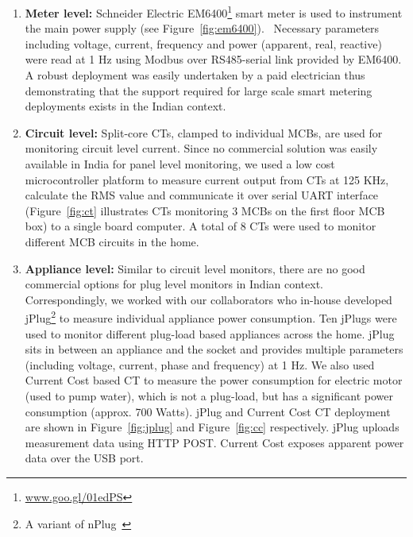 \documentclass[10pt]{sensys-proc}
\newcommand{\figref}[1]{Figure~\ref{#1}}
\newcommand{\denselistbib}{
  \itemsep -.6pt\topsep-4pt\partopsep-20pt
}
\begin{document}
\begin{enumerate}\denselistbib
\item \textbf{Meter level:} Schneider Electric EM6400\footnote{\url{www.goo.gl/01edPS}} smart meter is used to instrument the main power supply (see \figref{fig:em6400}).%
~Necessary parameters including voltage, current, frequency and power (apparent, real, reactive) were read at 1 Hz using Modbus over RS485-serial link provided by EM6400. A robust deployment was easily undertaken by a paid electrician thus demonstrating that the support required for large scale smart metering deployments exists in the Indian context. 

\item \textbf{Circuit level:} Split-core CTs, clamped to individual MCBs, are used for monitoring circuit level current. Since no commercial solution was easily available in India for panel level monitoring, we used a low cost microcontroller platform to measure current output from CTs at 125 KHz, calculate the RMS value and communicate it over serial UART interface (\figref{fig:ct} illustrates CTs monitoring 3 MCBs on the first floor MCB box) to a single board computer. A total of 8 CTs were used to monitor different MCB circuits in the home.

\item \textbf{Appliance level:} Similar to circuit level monitors, there are no good commercial options for plug level monitors in Indian context. Correspondingly, we worked with our collaborators who in-house developed jPlug\footnote{A variant of nPlug~\cite{nplug}} to measure individual appliance power consumption. Ten jPlugs were used to monitor different plug-load based appliances across the home. jPlug sits in between an appliance and the socket and provides multiple parameters (including voltage, current, phase and frequency) at 1 Hz. We also used Current Cost based CT to measure the power consumption for electric motor (used to pump water), which is not a plug-load, but has a significant power consumption (approx. 700 Watts). jPlug and Current Cost CT deployment are shown in \figref{fig:jplug} and \figref{fig:cc} respectively. jPlug uploads measurement data using HTTP POST. Current Cost exposes apparent power data over the USB port. 
\end{enumerate}
\end{document}

